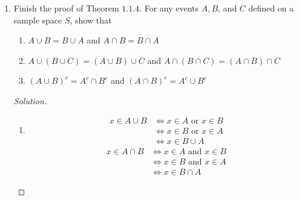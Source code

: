 \documentclass[12pt]{article}
\theoremstyle{definition}
\theoremstyle{plain}
\newenvironment{solution}
  {\begin{proof}[Solution]}
  {\end{proof}}
\newcommand{\Or}{\text{ or }}
\renewcommand{\And}{\text{ and }}
\begin{document}
\begin{enumerate}
\begin{solution}
\begin{enumerate}
	\item \begin{align*}
		x \in A \cup B &\iff x \in A \Or x\in B\\
		&\iff (x \in A \Or x \in B) \And \text{true}\\
		&\iff (x \in A \Or x \in B) \And (x \in A \Or x \notin A)\\
		&\iff x \in A \Or (x \in B \And x \notin A)\\
		&\iff x \in A \Or (x \in B \And x \in A^c)\\
		&\iff x \in A \Or x \in B \cap A^c\\
		&\iff x \in A \cup (B \cap A^c)
	\end{align*}
	\end{enumerate}
	\end{solution}
	
\item Finish the proof of Theorem $ 1.1.4 $. For any events $ A, B $, and $ C $ defined on a sample space $ S $, show that 
	\begin{enumerate}
	\item $ A \cup B = B \cup A $ and $ A \cap B = B \cap A $
	\item $ A \cup (B \cup C) = (A \cup B) \cup C $ and $ A \cap (B \cap C) = (A \cap B) \cap C $
	\item $ (A \cup B)^c = A^c \cap B^c $ and $ (A \cap B)^c = A^c \cup B^c $
	\end{enumerate}
	\begin{solution}
	\begin{enumerate}
	\item \begin{align*}
			x \in A \cup B &\iff x \in A  \Or  x \in B \\
			& \iff x \in B \Or x \in A\\
			& \iff x \in B \cup A
		\end{align*}
		\begin{align*}
			x \in A \cap B &\iff x \in A  \And  x \in B \\
			& \iff x \in B \And x \in A\\
			& \iff x \in B \cap A
		\end{align*}
		

\end{enumerate}
\end{solution}
\end{enumerate}
\end{document}
